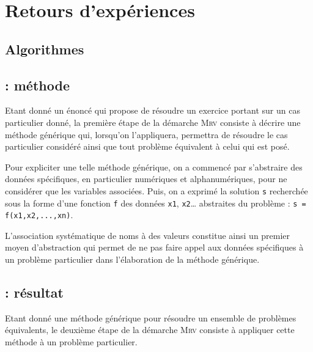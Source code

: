 \section{Retours d'expériences}\label{affectation:retours}

\subsection{Algorithmes}\label{affectation:retours:algorithmes}


\subsection{\mrv : méthode}\label{affectation:retours:methode}

Etant donné un énoncé qui propose de résoudre un exercice
portant sur un cas particulier donné, la première étape de la démarche \textsc{Mrv} consiste à
décrire une méthode générique qui, lorsqu'on l'appliquera, permettra de résoudre 
le cas particulier considéré ainsi que tout problème équivalent à celui 
qui est posé.

Pour expliciter une telle méthode générique, on a commencé par s'abstraire 
des données spécifiques, en particulier numériques et alphanumériques, 
pour ne considérer que les variables associées. 
Puis, on a exprimé
la solution \texttt{s} recherchée sous la forme d'une fonction \texttt{f} 
des données \texttt{x1}, \texttt{x2}\ldots{} abstraites du problème :
\texttt{s = f(x1,x2,...,xn)}.

L'association systématique de noms à des valeurs constitue ainsi un premier
moyen d'abstrac\-tion qui permet de ne pas faire appel aux
données spécifiques à un problème particulier
dans l'élabora\-tion de la méthode générique.

\subsection{\mrv : résultat}\label{affectation:retours:resultat}

Etant donné une méthode générique pour résoudre un ensemble de problèmes 
équivalents, le deuxième étape de la démarche \textsc{Mrv} consiste à
appliquer cette méthode à un problème particulier.

